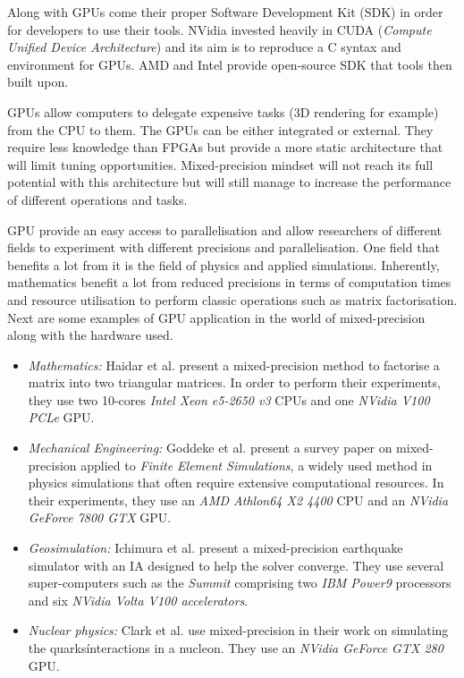 Along with GPUs come their proper Software Development Kit (SDK) in order for developers to use their tools. NVidia invested heavily in CUDA (\emph{Compute Unified Device Architecture}) \cite{CUDA} and its aim is to reproduce a C syntax and environment for GPUs. AMD and Intel provide open-source SDK that tools then built upon.

GPUs allow computers to delegate expensive tasks (3D rendering for example) from the CPU to them. The GPUs can be either integrated or external. They require less knowledge than FPGAs but provide a more static architecture that will limit tuning opportunities. Mixed-precision mindset will not reach its full potential with this architecture but will still manage to increase the performance of different operations and tasks.

GPU provide an easy access to parallelisation and allow researchers of different fields to experiment with different precisions and parallelisation. One field that benefits a lot from it is the field of physics and applied simulations. Inherently, mathematics benefit a lot from reduced precisions in terms of computation times and resource utilisation to perform classic operations such as matrix factorisation. Next are some examples of GPU application in the world of mixed-precision along with the hardware used.

\begin{itemize}
  \item \emph{Mathematics:} Haidar et al. \cite{Haidar2018} present a mixed-precision method to factorise a matrix into two triangular matrices. In order to perform their experiments, they use two 10-cores \emph{Intel Xeon e5-2650 v3} CPUs and one \emph{NVidia V100 PCLe} GPU.
  \item \emph{Mechanical Engineering:} Goddeke et al. \cite{Goddeke2007} present a survey paper on mixed-precision applied to \emph{Finite Element Simulations}, a widely used method in physics simulations that often require extensive computational resources. In their experiments, they use an \emph{AMD Athlon64 X2 4400} CPU and an \emph{NVidia GeForce 7800 GTX} GPU.
  \item \emph{Geosimulation:} Ichimura et al. \cite{Ichimura2018} present a mixed-precision earthquake simulator with an IA designed to help the solver converge. They use several super-computers such as the \emph{Summit} comprising two \emph{IBM Power9} processors and six \emph{NVidia Volta V100 accelerators}.
  \item \emph{Nuclear physics:} Clark et al. \cite{Clark2010} use mixed-precision in their work on simulating the quarks\' interactions in a nucleon. They use an \emph{NVidia GeForce GTX 280} GPU.
\end{itemize}

